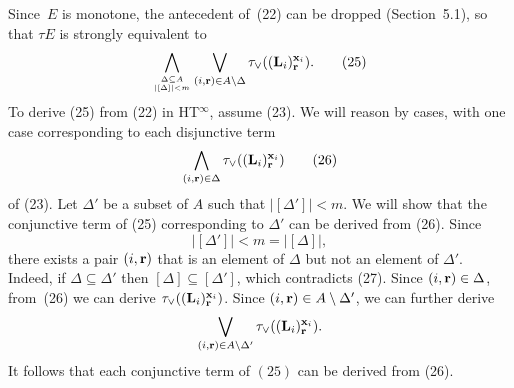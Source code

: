 \documentclass{tlp_mod}
\def\beq{\begin{equation}}
\def\eeq#1{\label{#1}\end{equation}}
\begin{document}
\begin{proof*}
Since~$E$ is monotone,
the antecedent of~(22) can be dropped
(Section~5.1), so that $\tau E$ is strongly equivalent to
\[
  \bigwedge_{ \Delta \subseteq A \atop \lvert [\Delta] \rvert < m}
  \bigvee_{(i,{\bf r}) \in A\setminus\Delta}
  \tau_{\lor}(({\bf L}_i)^{{\bf x}_i}_{\bf r}).
\tag{25}
\label{mono_geq}
\]
To derive (25) from (22) in HT\/$^\infty$,
assume (23). We will reason by cases, with one case 
corresponding to each disjunctive term 
\[
  \bigwedge_{(i,{\bf r}) \in \Delta}
  \tau_{\lor}(({\bf L}_i)^{{\bf x}_i}_{\bf r})
\tag{26}
\label{dterm}
\]
of (23). 
Let $\Delta'$ be a subset of $A$ such that 
$\lvert [\Delta']\rvert < m$.  
We will show that the conjunctive term 
of (25) corresponding to $\Delta'$ can be derived from 
(26).  Since 
\[
\lvert [\Delta'] \rvert < m = \lvert [\Delta]\rvert,
\tag{27}
\label{ineq}
\]
there exists a pair $(i, {\bf r})$ that is an element of $\Delta$ but 
not an element of $\Delta'$. Indeed, if \hbox{$\Delta \subseteq \Delta'$} then 
$[\Delta] \subseteq [\Delta']$, which contradicts (27). 
Since $(i, {\bf r}) \in \Delta$, from~(26) 
we can derive $\tau_{\lor}(({\bf L}_i)_{\bf r}^{{\bf x}_i})$. Since
$(i, {\bf r}) \in A \setminus \Delta'$, we can further derive 
$$
 \bigvee_{(i,{\bf r}) \in A\setminus\Delta'}
 \tau_{\lor}(({\bf L}_i)^{{\bf x}_i}_{\bf r}).
$$
It follows that each conjunctive term of $(25)$
can be derived from (26). 


\end{proof*}
\end{document}

